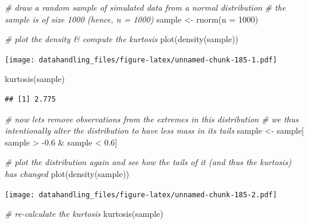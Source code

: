 \documentclass[
  12pt,
]{style/krantz}
\newenvironment{Shaded}{\begin{snugshade}}{\end{snugshade}}
\newcommand{\AttributeTok}[1]{\textcolor[rgb]{0.77,0.63,0.00}{#1}}
\newcommand{\CommentTok}[1]{\textcolor[rgb]{0.56,0.35,0.01}{\textit{#1}}}
\newcommand{\DecValTok}[1]{\textcolor[rgb]{0.00,0.00,0.81}{#1}}
\newcommand{\FloatTok}[1]{\textcolor[rgb]{0.00,0.00,0.81}{#1}}
\newcommand{\FunctionTok}[1]{\textcolor[rgb]{0.00,0.00,0.00}{#1}}
\newcommand{\NormalTok}[1]{#1}
\newcommand{\OtherTok}[1]{\textcolor[rgb]{0.56,0.35,0.01}{#1}}
\newcommand{\SpecialCharTok}[1]{\textcolor[rgb]{0.00,0.00,0.00}{#1}}
\begin{document}
\begin{Shaded}
\begin{Highlighting}[]
\CommentTok{\# draw a random sample of simulated data from a normal distribution}
\CommentTok{\# the sample is of size 1000 (hence, n = 1000)}
\NormalTok{sample }\OtherTok{\textless{}{-}} \FunctionTok{rnorm}\NormalTok{(}\AttributeTok{n =} \DecValTok{1000}\NormalTok{)}

\CommentTok{\# plot the density \& compute the kurtosis}
\FunctionTok{plot}\NormalTok{(}\FunctionTok{density}\NormalTok{(sample))}
\end{Highlighting}
\end{Shaded}

\texttt{[image: datahandling\_files/figure-latex/unnamed-chunk-185-1.pdf]}

\begin{Shaded}
\begin{Highlighting}[]
\FunctionTok{kurtosis}\NormalTok{(sample)}
\end{Highlighting}
\end{Shaded}

\begin{verbatim}
## [1] 2.775
\end{verbatim}

\begin{Shaded}
\begin{Highlighting}[]
\CommentTok{\# now lets remove observations from the extremes in this distribution}
\CommentTok{\# we thus intentionally alter the distribution to have less mass in its tails}
\NormalTok{sample }\OtherTok{\textless{}{-}}\NormalTok{ sample[ sample }\SpecialCharTok{\textgreater{}} \SpecialCharTok{{-}}\FloatTok{0.6} \SpecialCharTok{\&}\NormalTok{ sample }\SpecialCharTok{\textless{}} \FloatTok{0.6}\NormalTok{]}

\CommentTok{\# plot the distribution again and see how the tails of it (and thus the kurtosis) has changed}
\FunctionTok{plot}\NormalTok{(}\FunctionTok{density}\NormalTok{(sample))}
\end{Highlighting}
\end{Shaded}

\texttt{[image: datahandling\_files/figure-latex/unnamed-chunk-185-2.pdf]}

\begin{Shaded}
\begin{Highlighting}[]
\CommentTok{\# re{-}calculate the kurtosis}
\FunctionTok{kurtosis}\NormalTok{(sample)}
\end{Highlighting}
\end{Shaded}
\end{document}
